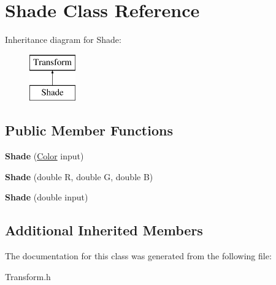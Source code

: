 \hypertarget{class_shade}{}\section{Shade Class Reference}
\label{class_shade}
Inheritance diagram for Shade\+:\begin{figure}[H]
\begin{center}
\leavevmode
\includegraphics[height=2.000000cm]{class_shade}
\end{center}
\end{figure}
\subsection*{Public Member Functions}
\begin{DoxyCompactItemize}
\item 
\hypertarget{class_shade_afdd84308cff9eebdd2d929079c64bb37}{}\label{class_shade_afdd84308cff9eebdd2d929079c64bb37} 
{\bfseries Shade} (\hyperlink{class_color}{Color} input)
\item 
\hypertarget{class_shade_a6602fccca82ffc97289403f1183bf18e}{}\label{class_shade_a6602fccca82ffc97289403f1183bf18e} 
{\bfseries Shade} (double R, double G, double B)
\item 
\hypertarget{class_shade_ac6c7c2a972788bbbad1504a39690dcde}{}\label{class_shade_ac6c7c2a972788bbbad1504a39690dcde} 
{\bfseries Shade} (double input)
\end{DoxyCompactItemize}
\subsection*{Additional Inherited Members}


The documentation for this class was generated from the following file\+:\begin{DoxyCompactItemize}
\item 
Transform.\+h\end{DoxyCompactItemize}
